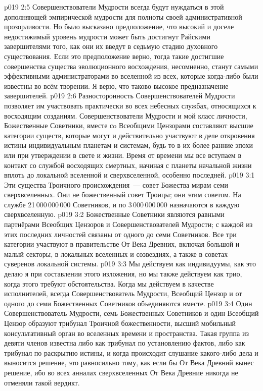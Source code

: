 \vs p019 2:5 Совершенствователи Мудрости всегда будут нуждаться в этой дополняющей эмпирической мудрости для полноты своей административной прозорливости. Но было высказано предположение, что высокий и доселе недостижимый уровень мудрости может быть достигнут Райскими завершителями  того, как они их введут в седьмую стадию духовного существования. Если это предположение верно, тогда такие достигшие совершенства существа эволюционного восхождения, несомненно, станут самыми эффективными администраторами во вселенной из всех, которые когда\hyp{}либо были известны во всём творении. Я верю, что таково высокое предназначение завершителей.
\vs p019 2:6 \pc Разносторонность Совершенствователей Мудрости позволяет им участвовать практически во всех небесных службах, относящихся к восходящим созданиям. Совершенствователи Мудрости и мой класс личности, Божественные Советники, вместе сo Всеобщими Цензорами составляют высшие категории существ, которые могут и действительно участвуют в деле откровения истины индивидуальным планетам и системам, будь то в их более ранние эпохи или при утверждении в свете и жизни. Время от времени мы все вступаем в контакт со службой восходящих смертных, начиная с планеты начальной жизни вплоть до локальной вселенной и сверхвселенной, особенно последней.
\vs p019 3:1 Эти существа Троичного происхождения~--- совет Божества мирам семи сверхвселенных. Они не  божественный совет Троицы; они  этим советом. На службе 21\,000\,000\,000 Советников, и по 3\,000\,000\,000 назначаются в каждую сверхвселенную.
\vs p019 3:2 Божественные Советники являются равными партнёрами Всеобщих Цензоров и Совершенствователей Мудрости; с каждой из этих последних личностей связаны от одного до семи Советников. Все три категории участвуют в правительстве От Века Древних, включая большой и малый секторы, в локальных вселенных и созвездиях, а также в советах суверенов локальной системы.
\vs p019 3:3 Мы действуем как индивидуумы, как это делаю я при составлении этого изложения, но мы также действуем как трио, когда этого требуют обстоятельства. Когда мы действуем в качестве исполнителей, всегда Совершенствователь Мудрости, Всеобщий Цензор и от одного до семи Божественных Советников объединяются вместе.
\vs p019 3:4 \pc Один Совершенствователь Мудрости, семь Божественных Советников и один Всеобщий Цензор образуют трибунал Троичной божественности, высший мобильный консультативный орган во вселенных времени и пространства. Такая группа из девяти членов известна либо как трибунал по установлению фактов, либо как трибунал по раскрытию истины, и когда происходит слушание какого\hyp{}либо дела и выносится решение, это равносильно тому, как если бы От Века Древний вынес решение, ибо во всех анналах сверхвселенных От Века Древние никогда не отменяли такой вердикт.
